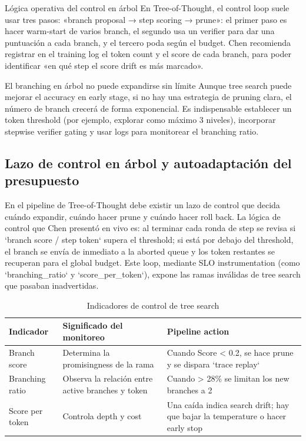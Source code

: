 \documentclass[a4paper]{article}
\begin{document}
\begin{knowledgebox}{Lógica operativa del control en árbol}
En Tree-of-Thought, el control loop suele usar tres pasos: «branch proposal → step scoring → prune»: el primer paso es hacer warm-start de varios branch, el segundo usa un verifier para dar una puntuación a cada branch, y el tercero poda según el budget. Chen recomienda registrar en el training log el token count y el score de cada branch, para poder identificar «en qué step el score drift es más marcado».
\end{knowledgebox}

\begin{warningbox}{El branching en árbol no puede expandirse sin límite}
Aunque tree search puede mejorar el accuracy en early stage, si no hay una estrategia de pruning clara, el número de branch crecerá de forma exponencial. Es indispensable establecer un token threshold (por ejemplo, explorar como máximo 3 niveles), incorporar stepwise verifier gating y usar logs para monitorear el branching ratio.
\end{warningbox}

\subsection{Lazo de control en árbol y autoadaptación del presupuesto}
En el pipeline de Tree-of-Thought debe existir un lazo de control que decida cuándo expandir, cuándo hacer prune y cuándo hacer roll back. La lógica de control que Chen presentó en vivo es: al terminar cada ronda de step se revisa si `branch score / step token` supera el threshold; si está por debajo del threshold, el branch se envía de inmediato a la aborted queue y los token restantes se recuperan para el global budget. Este loop, mediante SLO instrumentation (como `branching\_ratio` y `score\_per\_token`), expone las ramas inválidas de tree search que pasaban inadvertidas.

\begin{table}[H]
\centering
\caption{Indicadores de control de tree search}
\begin{tabular}{p{}p{}p{}}
\toprule
Indicador & Significado del monitoreo & Pipeline action \\
\midrule
Branch score & Determina la promisingness de la rama & Cuando Score < 0.2, se hace prune y se dispara `trace replay` \\
Branching ratio & Observa la relación entre active branches y token & Cuando > 28\% se limitan los new branches a 2 \\
Score per token & Controla depth y cost & Una caída indica search drift; hay que bajar la temperature o hacer early stop \\
\bottomrule
\end{tabular}
\end{table}
\end{document}
